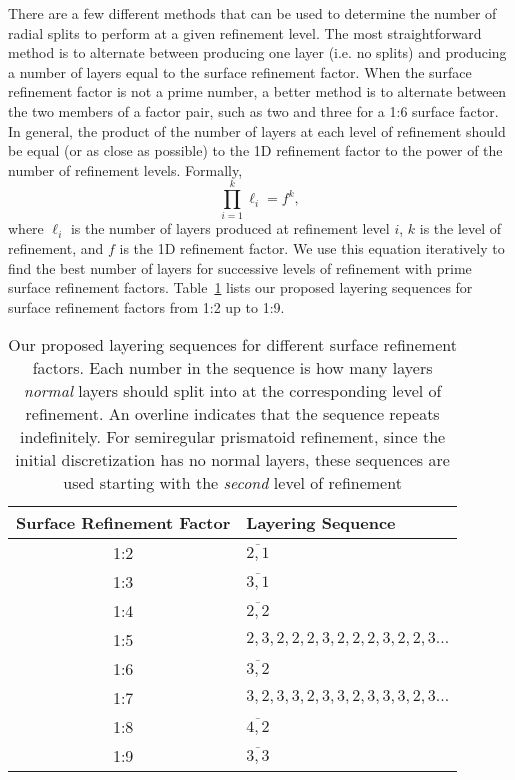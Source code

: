 There are a few different methods that can be used to determine the number of radial splits to perform at a given refinement level.
The most straightforward method is to alternate between producing one layer (i.e.
no splits) and producing a number of layers equal to the surface refinement factor.
When the surface refinement factor is not a prime number, a better method is to alternate between the two members of a factor pair, such as two and three for a 1:6 surface factor.
In general, the product of the number of layers at each level of refinement should be equal (or as close as possible) to the 1D refinement factor to the power of the number of refinement levels.
Formally,
%
\begin{equation*}
\prod_{i = 1}^{k} \ell_{i} = f^{k},
\end{equation*}
%
where $\ell_{i}$ is the number of layers produced at refinement level $i$, $k$ is the level of refinement, and $f$ is the 1D refinement factor.
We use this equation iteratively to find the best number of layers for successive levels of refinement with prime surface refinement factors.
Table~\ref{tab:layers} lists our proposed layering sequences for surface refinement factors from 1:2 up to 1:9.


\begin{table}[ht!]
	\centering
	\caption[Layering sequences for different surface refinement factors]{
		Our proposed layering sequences for different surface refinement factors.
		Each number in the sequence is how many layers \textit{normal} layers should split into at the corresponding level of refinement.
		An overline indicates that the sequence repeats indefinitely.
		For semiregular prismatoid refinement, since the initial discretization has no normal layers, these sequences are used starting with the \textit{second} level of refinement
	}
	\begin{tabular}{@{} c l @{}}
		\toprule
		Surface Refinement Factor & Layering Sequence         \\ \midrule
		1:2                  & $\overline{2,1}$               \\
		1:3                  & $\overline{3,1}$               \\
		1:4                  & $\overline{2,2}$               \\
		1:5                  & $2,3,2,2,2,3,2,2,2,3,2,2,3...$ \\
		1:6                  & $\overline{3,2}$               \\
		1:7                  & $3,2,3,3,2,3,3,2,3,3,3,2,3...$ \\
		1:8                  & $\overline{4,2}$               \\
		1:9                  & $\overline{3,3}$               \\ \bottomrule
	\end{tabular}
	\label{tab:layers}
\end{table}


